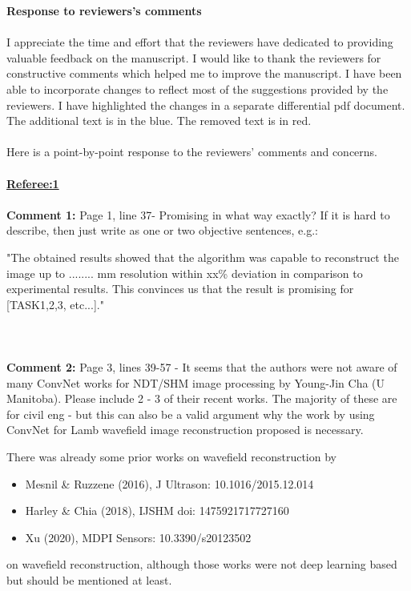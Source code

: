 \documentclass[11pt,a4paper]{article}
\begin{document}
	\textbf{Response to reviewers's comments} 
	\\ \\
	I appreciate the time and effort that the reviewers have dedicated to providing valuable feedback on the manuscript. I would like to thank the reviewers for constructive comments which helped me to improve the manuscript. I have been able to incorporate changes to reflect most of the suggestions provided by the reviewers. I have highlighted the changes in a separate differential pdf document. The additional text is in the blue. The removed text is in red.
	\\ \\
	Here is a point-by-point response to the reviewers' comments and concerns.
	\\ \\
	\underline{\textbf{Referee:1}}
	\\
	\\
	\textbf{Comment 1:} Page 1, line 37- Promising in what way exactly? If it is hard to describe, then just write as one or two objective sentences, e.g.:
	
	"The obtained results showed that the algorithm was capable to reconstruct the image up to ........ mm resolution within xx\% deviation in comparison to experimental results. This convinces us that the result is promising for [TASK1,2,3, etc...]."
	\\ \\
	\\ \\
	\color{black}\textbf{Comment 2:} Page 3, lines 39-57 - It seems that the authors were not aware of many ConvNet works for NDT/SHM image processing by Young-Jin Cha (U Manitoba). 
	Please include 2 - 3 of their recent works. The majority of these are for civil eng - but this can also be a valid argument why the work by using ConvNet for Lamb wavefield image reconstruction proposed is necessary.
	
	There was already some prior works on wavefield reconstruction by
	\begin{itemize}
		\item Mesnil \& Ruzzene (2016), J Ultrason: 10.1016/2015.12.014
		\item Harley \& Chia (2018), IJSHM doi: 1475921717727160
		\item Xu (2020), MDPI Sensors: 10.3390/s20123502
	\end{itemize}
	on wavefield reconstruction, although those works were not deep learning based but should be mentioned at least.
	
\end{document}
